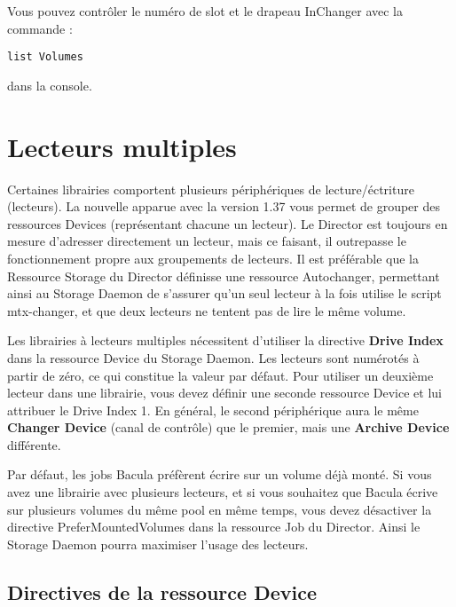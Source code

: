 Vous pouvez contr\^oler le num\'ero de slot et le drapeau InChanger avec la commande :

\begin{verbatim}
list Volumes
\end{verbatim}

dans la console.

\label{mult}
\section*{Lecteurs multiples}

Certaines librairies comportent plusieurs p\'eriph\'eriques de lecture/\'ectriture 
(lecteurs). La nouvelle  
apparue avec la version 1.37 vous permet de grouper des ressources Devices 
(repr\'esentant chacune un lecteur). Le Director est toujours en mesure 
d'adresser directement un lecteur, mais ce faisant, il outrepasse 
le fonctionnement propre aux groupements de lecteurs. Il est pr\'ef\'erable 
que la Ressource Storage du Director d\'efinisse une ressource 
Autochanger, permettant ainsi au Storage Daemon de s'assurer qu'un seul 
lecteur \`a la fois utilise le script mtx-changer, et que deux lecteurs ne tentent 
pas de lire le m\^eme volume.

Les librairies \`a lecteurs multiples n\'ecessitent d'utiliser la directive 
{\bf Drive Index} dans la ressource Device du Storage Daemon. Les 
lecteurs sont num\'erot\'es \`a partir de z\'ero, ce qui constitue la valeur par 
d\'efaut. Pour utiliser un deuxi\`eme lecteur dans une librairie, vous devez 
d\'efinir une seconde ressource Device et lui attribuer le Drive Index 1. 
En g\'en\'eral, le second p\'eriph\'erique aura le m\^eme {\bf Changer Device} 
(canal de contr\^ole) que le premier, mais une {\bf Archive Device} diff\'erente. 

Par d\'efaut, les jobs Bacula pr\'ef\`erent \'ecrire sur un volume d\'ej\`a mont\'e. 
Si vous avez une librairie avec plusieurs lecteurs, et si vous souhaitez que 
Bacula \'ecrive sur plusieurs volumes du m\^eme pool en m\^eme temps, vous devez 
d\'esactiver la directive  {PreferMountedVolumes} 
dans la ressource Job du Director. Ainsi le Storage Daemon pourra maximiser 
l'usage des lecteurs.

\label{ConfigRecords}
\subsection*{Directives de la ressource Device}


